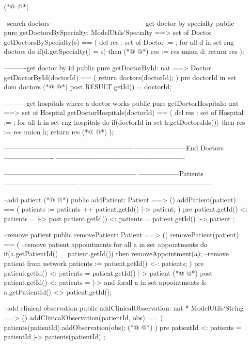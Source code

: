 \begin{vdmpp}[breaklines=true]
(*@
\label{getHospitalsById:187}
@*)
  
  --search doctors--------------------------------
  ----------get doctor by specialty
  public pure getDoctorsBySpecialty: ModelUtils`Specialty ==> set of Doctor
   getDoctorsBySpecialty(s) == (
    dcl res : set of Doctor := {};
    for all d in set rng doctors do
      if(d.getSpecialty() = s) then
(*@
\label{getHospitalsByCity:195}
@*)
       res := res union {d};
    return res
   );
  
  ----------get doctor by id
  public pure getDoctorById: nat ==> Doctor
   getDoctorById(doctorId) == (
    return doctors(doctorId);
   )
  pre doctorId in set dom doctors
(*@
\label{getHospitalsByName:205}
@*)
  post RESULT.getId() = doctorId;
   
  ----------get hospitals where a doctor works
  public pure getDoctorHospitals: nat ==> set of Hospital
   getDoctorHospitals(doctorId) == (
    dcl res : set of Hospital := {};
    for all h in set rng hospitals do
     if(doctorId in set h.getDoctorsIds()) then
      res := res union {h};
    return res
(*@
\label{getHospitalsByAgreement:215}
@*)
   );
   
  ---------------------------------------------------------
  -----------------------End Doctors ----------------------
  ---------------------------------------------------------
  
  
  -----------------------------------------------------------
  ------------------Patients---------------------------------
  -----------------------------------------------------------
  
  --add patient
(*@
\label{getHospitalSpecialties:227}
@*)
  public addPatient: Patient ==> ()
  addPatient(patient) == (
   patients := patients ++  { patient.getId() |-> patient};
  )
  pre {patient.getId() } <: patients = { |-> }  
  post {patient.getId() } <: patients = { patient.getId() |-> patient };
  
  --remove patient
  public removePatient: Patient ==> ()
  removePatient(patient) == (
   --remove patient appointments
   for all a in set appointments do 
    if(a.getPatientId() = patient.getId()) then
     removeAppointment(a);
   --remove patient from network
   patients := {patient.getId()} <-: patients;
  )
   pre {patient.getId()} <: patients = { patient.getId() |-> patient } 
(*@
\label{getDoctors:245}
@*)
  post {patient.getId()} <: patients = { |-> } and forall a in set appointments & a.getPatientId() <> patient.getId();
   
  --add clinical observation
  public addClinicalObservation: nat * ModelUtils`String ==> ()
  addClinicalObservation(patientId, obs) == (
   patients(patientId).addObservation(obs);
(*@
\label{addDoctor:251}
@*)
  )
   pre {patientId} <: patients = { patientId |-> patients(patientId) } ;
   

\end{vdmpp}
